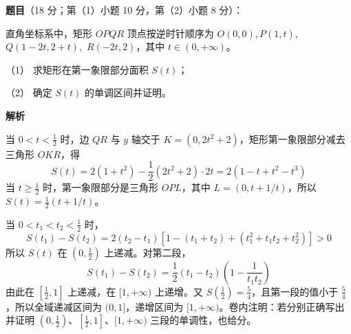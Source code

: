\begin{answer}

\textbf{题目}（18 分；第（1）小题 10 分，第（2）小题 8 分）：

直角坐标系中，矩形 \(OPQR\) 顶点按逆时针顺序为 \(O(0,0),P(1,t),\) \mbox{\(Q(1-2t,2+t),\)} \(R(-2t,2)\)，其中 \(t\in(0,+\infty)\)。

（1） 求矩形在第一象限部分面积 \(S(t)\)；

（2） 确定 \(S(t)\) 的单调区间并证明。

\textbf{解析}


当 \(0<t<\frac12\) 时，边 \(QR\) 与 \(y\) 轴交于 \(K=(0,2t^2+2)\)，矩形第一象限部分减去三角形 \(OKR\)，得
\nopagebreak[4]
\[
S(t)=2(1+t^2)-\frac12(2t^2+2)\cdot2t=2(1-t+t^2-t^3)
\]
当 \(t\ge\frac12\) 时，第一象限部分是三角形 \(OPL\)，其中 \(L=(0,t+1/t)\)，所以 \(S(t)=\frac12(t+1/t)\)。


当 \(0<t_1<t_2<\frac12\) 时，
\nopagebreak[4]
\[
S(t_1)-S(t_2)=2(t_2-t_1)\left[1-(t_1+t_2)+(t_1^2+t_1t_2+t_2^2)\right]>0
\]
所以 \(S(t)\) 在 \((0,\frac12)\) 上递减。对第二段，
\nopagebreak[4]
\[
S(t_1)-S(t_2)=\frac12(t_1-t_2)\left(1-\frac1{t_1t_2}\right)
\]
由此在 \([\frac12,1]\) 上递减，在 \([1,+\infty)\) 上递增。又 \(S(\frac12)=\frac54\)，且第一段的值小于 \(\frac54\)，所以全域递减区间为 \((0,1]\)，递增区间为 \([1,+\infty)\)。卷内注明：若分别正确写出并证明 \((0,\frac12)\)、\([\frac12,1]\)、\([1,+\infty)\) 三段的单调性，也给分。


\gkanswer{答案（2）：递减区间 \((0,1]\)，递增区间 \([1,+\infty)\)}

\end{answer}
